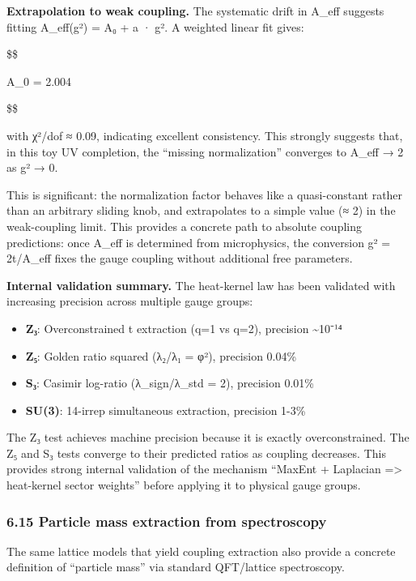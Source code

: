 \documentclass[11pt,a4paper]{article}
\theoremstyle{remark}
\providecommand{\tightlist}{%
  \setlength{\itemsep}{0pt}\setlength{\parskip}{0pt}}
\begin{document}
\textbf{Extrapolation to weak coupling.} The systematic drift in A\_eff
suggests fitting A\_eff(g²) = A₀ + a · g². A weighted linear
fit gives:

\$\$

A\_0 = 2.004 

\$\$

with χ²/dof ≈ 0.09, indicating excellent consistency. This
strongly suggests that, in this toy UV completion, the ``missing normalization''
converges to A\_eff → 2 as g² → 0.

This is significant: the normalization factor behaves like a quasi-constant
rather than an arbitrary sliding knob, and extrapolates to a simple value
(≈ 2) in the weak-coupling limit. This provides a concrete path to
absolute coupling predictions: once A\_eff is determined from
microphysics, the conversion g² = 2t/A\_eff fixes the gauge
coupling without additional free parameters.

\textbf{Internal validation summary.} The heat-kernel law has been validated with
increasing precision across multiple gauge groups:

\begin{itemize}
\tightlist
\item
  \textbf{Z₃}: Overconstrained t extraction (q=1 vs q=2), precision \textasciitilde10⁻¹⁴
\item
  \textbf{Z₅}: Golden ratio squared (λ₂/λ₁ = φ²), precision 0.04\%
\item
  \textbf{S₃}: Casimir log-ratio (λ\_sign/λ\_std = 2), precision 0.01\%
\item
  \textbf{SU(3)}: 14-irrep simultaneous extraction, precision 1-3\%
\end{itemize}

The Z₃ test achieves machine precision because it is exactly
overconstrained. The Z₅ and S₃ tests converge to their
predicted ratios as coupling decreases. This provides strong internal
validation of the mechanism ``MaxEnt + Laplacian =\textgreater{} heat-kernel
sector weights'' before applying it to physical gauge groups.

\subsubsection{6.15 Particle mass extraction from spectroscopy}\label{particle-mass-extraction-from-spectroscopy}

The same lattice models that yield coupling extraction also provide a concrete
definition of ``particle mass'' via standard QFT/lattice spectroscopy.
\end{document}
